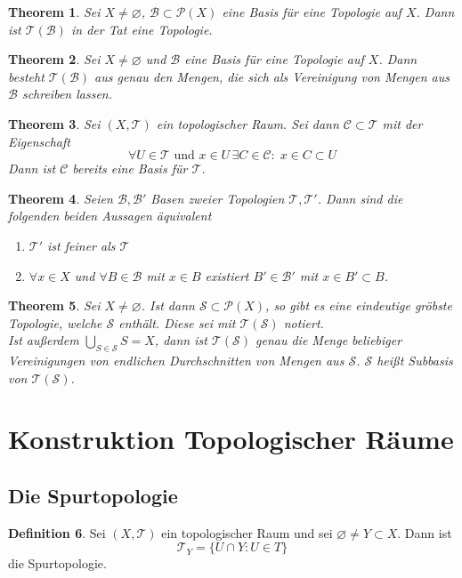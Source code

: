 \documentclass[a4paper, 12pt]{article}
\theoremstyle{plain}
\newtheorem{theorem}{Theorem}[section] %
\theoremstyle{definition}
\newtheorem{definition}[theorem]{Definition} %
\theoremstyle{lemma}
\theoremstyle{remark}
\theoremstyle{corollary}
\theoremstyle{example}
\begin{document}
	\begin{theorem}
		Sei $X \neq \varnothing$, $\mathcal{B} \subset \mathcal{P}(X)$ eine Basis für eine Topologie auf $X$. Dann ist $\mathcal{T}(\mathcal{B})$ in der Tat eine Topologie.
	\end{theorem}
	\begin{theorem}
		Sei $X \neq \varnothing$ und $\mathcal{B}$ eine Basis für eine Topologie auf $X$. Dann besteht $\mathcal{T}(\mathcal{B})$ aus genau den Mengen, die sich als Vereinigung von Mengen aus $\mathcal{B}$ schreiben lassen.
	\end{theorem}
	\begin{theorem}
		Sei $(X,\mathcal{T})$ ein topologischer Raum. Sei dann $\mathcal{C} \subset \mathcal{T}$ mit der Eigenschaft \[\forall U \in \mathcal{T} \text{ und } x \in U \, \exists C \in \mathcal{C}: \; x \in C \subset U\]
		Dann ist $\mathcal{C}$ bereits eine Basis für $\mathcal{T}$.
	\end{theorem}
	\begin{theorem}
		Seien $\mathcal{B}, \mathcal{B}'$ Basen zweier Topologien $\mathcal{T}, \mathcal{T}'$. Dann sind die folgenden beiden Aussagen äquivalent \begin{enumerate}
			\item $\mathcal{T}'$ ist feiner als $\mathcal{T}$
			\item $\forall x \in X$ und $\forall B \in \mathcal{B}$ mit $x\in B$ existiert $B'\in \mathcal{B}'$ mit $x\in B' \subset B$.
		\end{enumerate}
	\end{theorem}
	\begin{theorem}
		Sei $X \neq \varnothing$. Ist dann $\mathcal{S}\subset \mathcal{P}(X)$, so gibt es eine eindeutige gröbste Topologie, welche $\mathcal{S}$ enthält. Diese sei mit $\mathcal{T}(\mathcal{S})$ notiert.\\
		Ist außerdem $\bigcup_{S \in \mathcal{S}} S = X$, dann ist $\mathcal{T}(\mathcal{S})$ genau die Menge beliebiger Vereinigungen von endlichen Durchschnitten von Mengen aus $\mathcal{S}$. $\mathcal{S}$ heißt Subbasis von $\mathcal{T}(\mathcal{S})$.
	\end{theorem}
\section{Konstruktion Topologischer Räume}
	\subsection{Die Spurtopologie}
	\begin{definition}
		Sei $(X,\mathcal{T})$ ein topologischer Raum und sei $\varnothing \neq Y \subset X$. Dann ist \[\mathcal{T}_Y = \{U \cap Y: U \in T\}\] die Spurtopologie.
	\end{definition}
\end{document}
